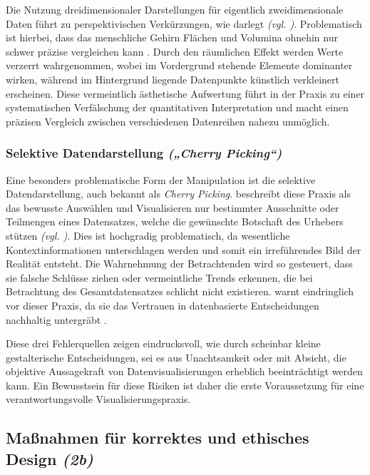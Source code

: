 Die Nutzung dreidimensionaler Darstellungen für eigentlich zweidimensionale Daten führt zu perspektivischen Verkürzungen, wie \citeauthor{2} darlegt \textit{(\acs{vgl.} \cite[54, 58]{2})}. Problematisch ist hierbei, dass das menschliche Gehirn Flächen und Volumina ohnehin nur schwer präzise vergleichen kann \cite[27, 53]{2}. Durch den räumlichen Effekt werden Werte verzerrt wahrgenommen, wobei im Vordergrund stehende Elemente dominanter wirken, während im Hintergrund liegende Datenpunkte künstlich verkleinert erscheinen. Diese vermeintlich ästhetische Aufwertung führt in der Praxis zu einer systematischen Verfälschung der quantitativen Interpretation und macht einen präzisen Vergleich zwischen verschiedenen Datenreihen nahezu unmöglich.

\subsubsection{Selektive Datendarstellung \textit{(„Cherry Picking“)}}

Eine besonders problematische Form der Manipulation ist die selektive Datendarstellung, auch bekannt als \textit{Cherry Picking}. \citeauthor{2} beschreibt diese Praxis als das bewusste Auswählen und Visualisieren nur bestimmter Ausschnitte oder Teilmengen eines Datensatzes, welche die gewünschte Botschaft des Urhebers stützen \textit{(\acs{vgl.} \cite[71]{2})}. Dies ist hochgradig problematisch, da wesentliche Kontextinformationen unterschlagen werden und somit ein irreführendes Bild der Realität entsteht. Die Wahrnehmung der Betrachtenden wird so gesteuert, dass sie falsche Schlüsse ziehen oder vermeintliche Trends erkennen, die bei Betrachtung des Gesamtdatensatzes schlicht nicht existieren. \citeauthor{2} warnt eindringlich vor dieser Praxis, da sie das Vertrauen in datenbasierte Entscheidungen nachhaltig untergräbt \cite[71]{2}.

Diese drei Fehlerquellen zeigen eindrucksvoll, wie durch scheinbar kleine gestalterische Entscheidungen, sei es aus Unachtsamkeit oder mit Absicht, die objektive Aussagekraft von Datenvisualisierungen erheblich beeinträchtigt werden kann. Ein Bewusstsein für diese Risiken ist daher die erste Voraussetzung für eine verantwortungsvolle Visualisierungspraxis.


\subsection{Maßnahmen für korrektes und ethisches Design \textit{(2b)}}
\label{sec:2b}

